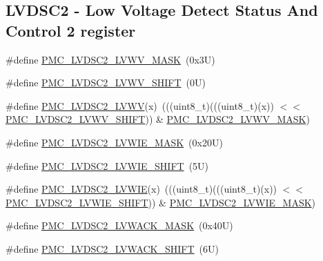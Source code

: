 \subsection*{L\+V\+D\+S\+C2 -\/ Low Voltage Detect Status And Control 2 register}
\begin{DoxyCompactItemize}
\item 
\#define \mbox{\hyperlink{group___p_m_c___register___masks_gaab1198a446bb9b8412589eeb12311666}{P\+M\+C\+\_\+\+L\+V\+D\+S\+C2\+\_\+\+L\+V\+W\+V\+\_\+\+M\+A\+SK}}~(0x3\+U)
\item 
\#define \mbox{\hyperlink{group___p_m_c___register___masks_gabd2e288b833d9e66c422b814dc7b5f03}{P\+M\+C\+\_\+\+L\+V\+D\+S\+C2\+\_\+\+L\+V\+W\+V\+\_\+\+S\+H\+I\+FT}}~(0\+U)
\item 
\#define \mbox{\hyperlink{group___p_m_c___register___masks_ga4599ee84bb111c3f42a8613447ca823d}{P\+M\+C\+\_\+\+L\+V\+D\+S\+C2\+\_\+\+L\+V\+WV}}(x)~(((uint8\+\_\+t)(((uint8\+\_\+t)(x)) $<$$<$ \mbox{\hyperlink{group___p_m_c___register___masks_gabd2e288b833d9e66c422b814dc7b5f03}{P\+M\+C\+\_\+\+L\+V\+D\+S\+C2\+\_\+\+L\+V\+W\+V\+\_\+\+S\+H\+I\+FT}})) \& \mbox{\hyperlink{group___p_m_c___register___masks_gaab1198a446bb9b8412589eeb12311666}{P\+M\+C\+\_\+\+L\+V\+D\+S\+C2\+\_\+\+L\+V\+W\+V\+\_\+\+M\+A\+SK}})
\item 
\#define \mbox{\hyperlink{group___p_m_c___register___masks_ga3a9de69524d99d6ec8985d211bc7861d}{P\+M\+C\+\_\+\+L\+V\+D\+S\+C2\+\_\+\+L\+V\+W\+I\+E\+\_\+\+M\+A\+SK}}~(0x20\+U)
\item 
\#define \mbox{\hyperlink{group___p_m_c___register___masks_gaf5cb9cf53bade8254aa7749b5eb36eff}{P\+M\+C\+\_\+\+L\+V\+D\+S\+C2\+\_\+\+L\+V\+W\+I\+E\+\_\+\+S\+H\+I\+FT}}~(5\+U)
\item 
\#define \mbox{\hyperlink{group___p_m_c___register___masks_ga48d1cdfca4a7c154993c1e741101a07d}{P\+M\+C\+\_\+\+L\+V\+D\+S\+C2\+\_\+\+L\+V\+W\+IE}}(x)~(((uint8\+\_\+t)(((uint8\+\_\+t)(x)) $<$$<$ \mbox{\hyperlink{group___p_m_c___register___masks_gaf5cb9cf53bade8254aa7749b5eb36eff}{P\+M\+C\+\_\+\+L\+V\+D\+S\+C2\+\_\+\+L\+V\+W\+I\+E\+\_\+\+S\+H\+I\+FT}})) \& \mbox{\hyperlink{group___p_m_c___register___masks_ga3a9de69524d99d6ec8985d211bc7861d}{P\+M\+C\+\_\+\+L\+V\+D\+S\+C2\+\_\+\+L\+V\+W\+I\+E\+\_\+\+M\+A\+SK}})
\item 
\#define \mbox{\hyperlink{group___p_m_c___register___masks_ga8b0c8bcad4d38e6ff797e9bc3d9db6d7}{P\+M\+C\+\_\+\+L\+V\+D\+S\+C2\+\_\+\+L\+V\+W\+A\+C\+K\+\_\+\+M\+A\+SK}}~(0x40\+U)
\item 
\#define \mbox{\hyperlink{group___p_m_c___register___masks_ga99ad1d373a7be7591a7ee3577bed5374}{P\+M\+C\+\_\+\+L\+V\+D\+S\+C2\+\_\+\+L\+V\+W\+A\+C\+K\+\_\+\+S\+H\+I\+FT}}~(6\+U)

\end{DoxyCompactItemize}
